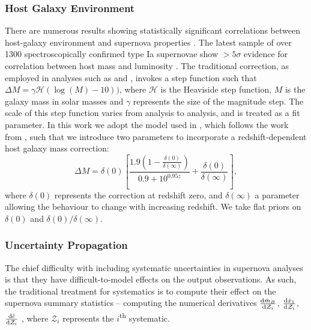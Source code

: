 \documentclass[twocolumn,trackchanges,tighten]{aastex62}
\newcommand{\Z}{\mathcal{Z}}
\newcommand{\rubin}{\citetalias{Rubin2015}}
\begin{document}
\subsubsection{Host Galaxy Environment}
\label{sec:hostgal}

There are numerous results showing statistically significant correlations between host-galaxy environment and supernova properties \citep{Kelly2010, Lampeitl2010, Sullivan2010, DAndrea2011, Gupta2011, Johansson2013, Rigault2013}. The latest sample of over 1300 spectroscopically confirmed type Ia supernovae show $>5\sigma$ evidence for correlation between host mass and luminosity \citep{Uddin2017}. The traditional correction, as employed in analyses such as \citet{Suzuki2012} and \citet{Betoule2014}, invokes a step function such that $\Delta M = \gamma \mathcal{H}(\log(M) - 10))$, where $\mathcal{H}$ is the Heaviside step function, $M$ is the galaxy mass in solar masses and $\gamma$ represents the size of the magnitude step. The scale of this step function varies from analysis to analysis, and is treated as a fit parameter. In this work we adopt the model used in {\rubin}, which follows the work from \citet{Rigault2013}, such that we introduce two parameters to incorporate a redshift-dependent host galaxy mass correction:
\begin{equation}
\Delta M = \delta(0) \left[ \frac{1.9\left(1 - \frac{\delta(0)}{\delta(\infty)}\right)  }{0.9 + 10^{0.95z}} + \frac{\delta(0)}{\delta(\infty)}\right], \label{eq:mass}
\end{equation}
where $\delta(0)$ represents the correction at redshift zero, and $\delta(\infty)$ a parameter allowing the behaviour to change with increasing redshift. We take flat priors on $\delta(0)$ and $\delta(0)/\delta(\infty)$.



\subsubsection{Uncertainty Propagation}
\label{sec:systreat}
The chief difficulty with including systematic uncertainties in supernova analyses is that they have difficult-to-model effects on the output observations. As such, the traditional treatment for systematics is to compute their effect on the supernova summary statistics -- computing the numerical derivatives $\frac{{\rm d} \hat{m}_B}{{\rm d} \Z_i}$, $\frac{{\rm d} \hat{x}_1}{{\rm d} \Z_i}$, $\frac{{\rm d} \hat{c}}{{\rm d} \Z_i}$ , where $\Z_i$ represents the $i$\textsuperscript{th} systematic.
\end{document}

